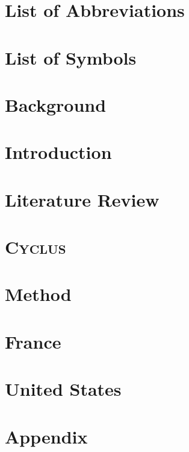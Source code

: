 \documentclass{report}
\newcommand{\Cyclus}{\textsc{Cyclus}\xspace}%
\begin{document}
\chapter{List of Abbreviations}
\printglossaries
\chapter{List of Symbols}


\pagebreak

\chapter{Background}


\chapter{Introduction}


\chapter{Literature Review}


\chapter{\Cyclus}


\chapter{Method}


\FloatBarrier


\chapter{France}



\chapter{United States}


\chapter{Appendix}






\end{document}
